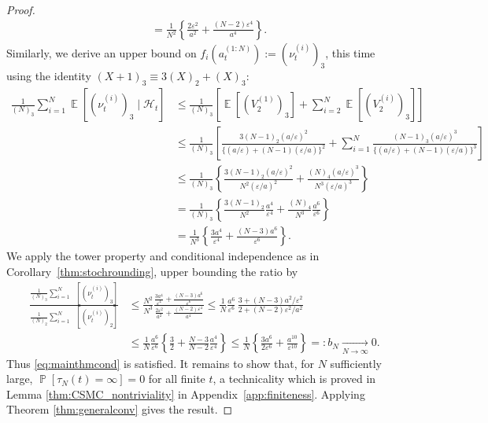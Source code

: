 \documentclass{article} %
\theoremstyle{definition}
\DeclareMathOperator{\Prob}{\mathbb{P}}
\DeclareMathOperator{\E}{\mathbb{E}}
\DeclareMathOperator{\Et}{\mathbb{E}_t}
\newcommand{\1}[1]{\mathbbm{1}_{\{#1\}}}
\begin{document}
\begin{proof}
\begin{align}
&= \frac{1}{N^2} \left\{\frac{2\varepsilon^2}{a^2} + \frac{(N-2)\varepsilon^4}{a^4}  \right\} . \label{eq:CSMC_cN_LB}
\end{align}
Similarly, we derive an upper bound on $f_i(a_t^{(1:N)}) := (\nu_t^{(i)})_3$, this time using the identity $(X+1)_3 \equiv 3(X)_2 +(X)_3 $:
\begin{align*}
\frac{1}{(N)_3} \sum_{i=1}^N \E[ (\nu_t^{(i)})_3 \mid \mathcal{H}_t]
&\leq \frac{1}{(N)_3} \left[ \E[ (V_2^{(1)})_3 ] + \sum_{i=2}^N \E[ (V_2^{(i)})_3 ] \right] \\
&\leq \frac{1}{(N)_3} \left[ \frac{ 3 (N-1)_2 (a/\varepsilon)^2}{\{(a/\varepsilon) + (N-1)(\varepsilon/a)\}^2} + \sum_{i=1}^N \frac{(N-1)_3 (a/\varepsilon)^3}{\{(a/\varepsilon) + (N-1)(\varepsilon/a)\}^3} \right] \\
&\leq \frac{1}{(N)_3} \left\{ \frac{3(N-1)_2 (a/\varepsilon)^2}{N^2 (\varepsilon/a)^2} + \frac{(N)_4 (a/\varepsilon)^3}{N^3 (\varepsilon/a)^3} \right\} \\
&= \frac{1}{(N)_3} \left\{ \frac{3(N-1)_2}{N^2} \frac{a^4}{\varepsilon^4} +\frac{(N)_4}{N^3} \frac{a^6}{\varepsilon^6} \right\} \\
&= \frac{1}{N^3} \left\{ \frac{3a^4}{\varepsilon^4} + \frac{(N-3) a^6}{\varepsilon^6} \right\} .
\end{align*}
We apply the tower property and conditional independence as in Corollary~\ref{thm:stochrounding}, upper bounding the ratio by
\begin{align*}
\frac{\frac{1}{(N)_3} \sum_{i=1}^N \Et[ (\nu_t^{(i)})_3 ]}{\frac{1}{(N)_2} \sum_{i=1}^N \Et[ (\nu_t^{(i)})_2 ]}
&\leq \frac{N^2}{N^3} \frac{ \frac{3a^4}{\varepsilon^4} + \frac{(N-3)a^6}{\varepsilon^6} }{ \frac{2\varepsilon^2}{a^2} + \frac{(N-2)\varepsilon^4}{a^4} }
\leq \frac{1}{N} \frac{a^6}{\varepsilon^6}\, \frac{3 + (N-3) a^2 / \varepsilon^2 }{2 + (N-2) \varepsilon^2 / a^2} \\
&\leq \frac{1}{N} \frac{a^6}{\varepsilon^6} \left\{ \frac{3}{2} + \frac{N-3}{N-2} \frac{a^4}{\varepsilon^4} \right\}
\leq \frac{1}{N} \left\{ \frac{3 a^6}{2 \varepsilon^6} + \frac{a^{10}}{\varepsilon^{10}} \right\}
=: b_N \underset{N\to\infty}{\longrightarrow} 0.
\end{align*}
Thus \eqref{eq:mainthmcond} is satisfied. It remains to show that, for $N$ sufficiently large, $\Prob[ \tau_N(t) = \infty ] =0$ for all finite $t$, a technicality which is proved in Lemma \ref{thm:CSMC_nontriviality} in Appendix~\ref{app:finiteness}. Applying Theorem \ref{thm:generalconv} gives the result.
\end{proof}
\end{document}
